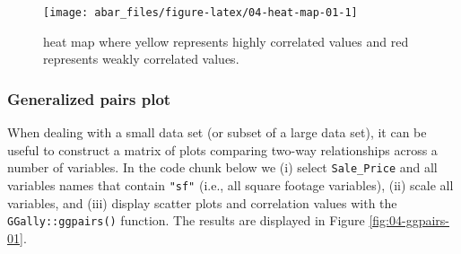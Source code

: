 \documentclass[]{book}
\newenvironment{Shaded}{\begin{snugshade}}{\end{snugshade}}
\newcommand{\CommentTok}[1]{\textcolor[rgb]{0.56,0.35,0.01}{\textit{#1}}}
\newcommand{\DataTypeTok}[1]{\textcolor[rgb]{0.13,0.29,0.53}{#1}}
\newcommand{\KeywordTok}[1]{\textcolor[rgb]{0.13,0.29,0.53}{\textbf{#1}}}
\newcommand{\NormalTok}[1]{#1}
\newcommand{\OperatorTok}[1]{\textcolor[rgb]{0.81,0.36,0.00}{\textbf{#1}}}
\newcommand{\OtherTok}[1]{\textcolor[rgb]{0.56,0.35,0.01}{#1}}
\newcommand{\StringTok}[1]{\textcolor[rgb]{0.31,0.60,0.02}{#1}}
\theoremstyle{definition}
\theoremstyle{definition}
\theoremstyle{definition}
\theoremstyle{remark}
\begin{document}
\begin{Shaded}
\end{Shaded}

\begin{figure}

{\centering \texttt{[image: abar\_files/figure-latex/04-heat-map-01-1]} 

}

\caption{heat map where yellow represents highly correlated values and red represents weakly correlated values.}\label{fig:04-heat-map-01}
\end{figure}

\hypertarget{generalized-pairs-plot}{%
\subsubsection{Generalized pairs plot}\label{generalized-pairs-plot}}

When dealing with a small data set (or subset of a large data set), it
can be useful to construct a matrix of plots comparing two-way
relationships across a number of variables. In the code chunk below we
(i) select \texttt{Sale\_Price} and all variables names that contain
\texttt{"sf"} (i.e., all square footage variables), (ii) scale all
variables, and (iii) display scatter plots and correlation values with
the \texttt{GGally::ggpairs()} function. The results are displayed in
Figure \ref{fig:04-ggpairs-01}.

\begin{Shaded}
\end{Shaded}
\end{document}
